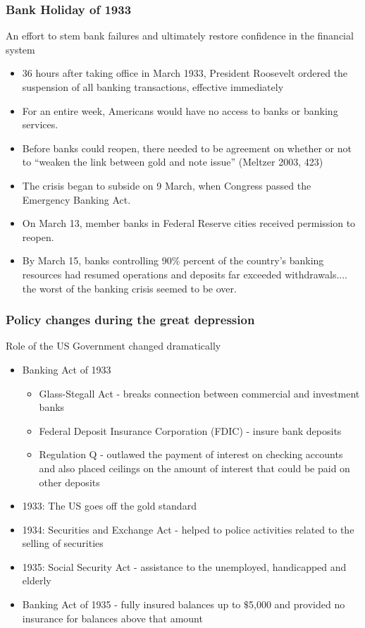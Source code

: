 \documentclass[11pt]{beamer}
\begin{document}
\begin{frame}
\frametitle{Bank Holiday of 1933}
An effort to stem bank failures and ultimately restore confidence in the financial system
\begin{itemize}
\item 36 hours after taking office in March 1933, President Roosevelt ordered the suspension of all banking transactions, effective immediately
\item For an entire week, Americans would have no access to banks or banking services.
\item Before banks could reopen, there needed to be agreement on whether or not to “weaken the link between gold and note issue” (Meltzer 2003, 423)
\item The crisis began to subside on 9 March, when Congress passed the Emergency Banking Act.
\item On March 13, member banks in Federal Reserve cities received permission to reopen.
\item By March 15, banks controlling 90$\%$ percent of the country’s banking resources had resumed operations and deposits far exceeded withdrawals.... the worst of the banking crisis seemed to be over.
\end{itemize}
\end{frame}





\begin{frame}
\frametitle{Policy changes during the great depression}

Role of the US Government changed dramatically

\begin{itemize}
\item Banking Act of 1933
\begin{itemize}
\item Glass-Stegall Act - breaks connection between commercial and investment banks
\item Federal Deposit Insurance Corporation (FDIC) - insure bank deposits
\item Regulation Q - outlawed the payment of interest on checking accounts and also placed ceilings on the amount of interest that could be paid on other deposits
\end{itemize}

\item 1933: The US goes off the gold standard
\item 1934: Securities and Exchange Act - helped to police activities related to the selling of securities
\item 1935: Social Security Act - assistance to the unemployed, handicapped and elderly
\item  Banking Act of 1935 - fully insured balances up to $\$$5,000 and provided no insurance for balances above that amount
\end{itemize}
\end{frame}
\end{document}

